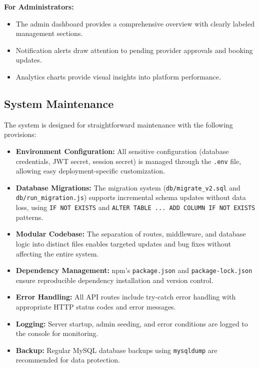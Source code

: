 \textbf{For Administrators:}
\begin{itemize}[leftmargin=2em]
    \item The admin dashboard provides a comprehensive overview with clearly labeled management sections.
    \item Notification alerts draw attention to pending provider approvals and booking updates.
    \item Analytics charts provide visual insights into platform performance.
\end{itemize}

\subsection{System Maintenance}

The system is designed for straightforward maintenance with the following provisions:

\begin{itemize}[leftmargin=2em]
    \item \textbf{Environment Configuration:} All sensitive configuration (database credentials, JWT secret, session secret) is managed through the \texttt{.env} file, allowing easy deployment-specific customization.
    \item \textbf{Database Migrations:} The migration system (\texttt{db/migrate\_v2.sql} and \texttt{db/run\_migration.js}) supports incremental schema updates without data loss, using \texttt{IF NOT EXISTS} and \texttt{ALTER TABLE ... ADD COLUMN IF NOT EXISTS} patterns.
    \item \textbf{Modular Codebase:} The separation of routes, middleware, and database logic into distinct files enables targeted updates and bug fixes without affecting the entire system.
    \item \textbf{Dependency Management:} npm's \texttt{package.json} and \texttt{package-lock.json} ensure reproducible dependency installation and version control.
    \item \textbf{Error Handling:} All API routes include try-catch error handling with appropriate HTTP status codes and error messages.
    \item \textbf{Logging:} Server startup, admin seeding, and error conditions are logged to the console for monitoring.
    \item \textbf{Backup:} Regular MySQL database backups using \texttt{mysqldump} are recommended for data protection.
\end{itemize}

